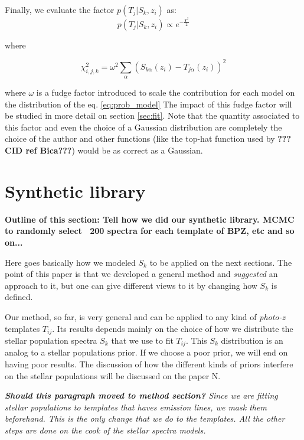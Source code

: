 \documentclass[a4paper, useAMS, usenatbib, hyperpdf]{mn2e}
\begin{document}
Finally, we evaluate the factor $p(T_{j}|S_{k},z_{i})$ as:
\begin{equation}
p(T_{j}|S_{k}, z_{i}) \propto e^{-\frac{\chi^2}{2}}
\end{equation}

\noindent where

\begin{equation}
\chi^2_{i, j, k} = \omega^2 \sum_\alpha \left( S_{k\alpha}(z_i) - T_{j\alpha}(z_i) \right)^2
\end{equation}

\noindent where $\omega$ is a fudge factor introduced to scale the contribution for each model on the distribution of the eq. \ref{eq:prob_model} The impact of this fudge factor will be studied in more detail on section \ref{sec:fit}. Note that the quantity associated to this factor and even the choice of a Gaussian distribution are completely the choice of the author and other functions (like the top-hat function used by {\bf \color{red} ???CID ref Bica???}) would be as correct as a Gaussian.




\section{Synthetic library}
\label{sec:library}
{\bf \color{red} Outline of this section: Tell how we did our synthetic library. MCMC to randomly select ~200 spectra for each template of BPZ, etc and so on...

Here goes basically how we modeled $S_k$ to be applied on the next sections. The point of this paper is that we developed a general method and {\it suggested} an approach to it, but one can give different views to it by changing how $S_k$ is defined.}

Our method, so far, is very general and can be applied to any kind of {\it photo-z} templates $T_{ij}$. Its results depends mainly on the choice of how we distribute the stellar population spectra $S_k$ that we use to fit $T_{ij}$. This $S_k$ distribution is an analog to a stellar populations prior. If we choose a poor prior, we will end on having poor results. The discussion of how the different kinds of priors interfere on the stellar populations will be discussed on the paper N.

{\it {\bf Should this paragraph moved to method section?} Since we are fitting stellar populations to templates that haves emission lines, we mask them beforehand. This is the only change that we do to the templates. All the other steps are done on the cook of the stellar spectra models.}
\end{document}
